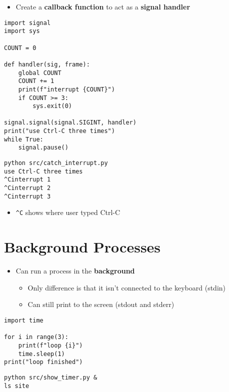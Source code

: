 \documentclass[krantzl]{krantz}
\newcommand{\glossref}[1]{\textbf{#1}}
\begin{document}
\begin{itemize}
\item Create a \glossref{callback function}
    to act as a \glossref{signal handler}

\end{itemize}
\begin{lstlisting}[frame=tblr]
import signal
import sys

COUNT = 0

def handler(sig, frame):
    global COUNT
    COUNT += 1
    print(f"interrupt {COUNT}")
    if COUNT >= 3:
        sys.exit(0)

signal.signal(signal.SIGINT, handler)
print("use Ctrl-C three times")
while True:
    signal.pause()
\end{lstlisting}

\begin{lstlisting}[frame=tblr,backgroundcolor=\color{black!5}]
python src/catch_interrupt.py
use Ctrl-C three times
^Cinterrupt 1
^Cinterrupt 2
^Cinterrupt 3
\end{lstlisting}

\begin{itemize}
\item \texttt{{\textasciicircum}C} shows where user typed Ctrl-C

\end{itemize}
\section{Background Processes}
\begin{itemize}
\item Can run a process in the \glossref{background}\begin{itemize}
\item Only difference is that it isn’t connected to the keyboard (stdin)

\item Can still print to the screen (stdout and stderr)

\end{itemize}


\end{itemize}
\begin{lstlisting}[frame=tblr]
import time

for i in range(3):
    print(f"loop {i}")
    time.sleep(1)
print("loop finished")
\end{lstlisting}

\begin{lstlisting}[frame=tblr]
python src/show_timer.py &
ls site
\end{lstlisting}
\end{document}
